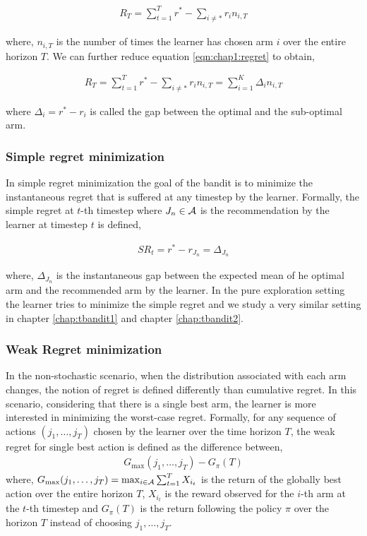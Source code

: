 \begin{eqnarray}
R_{T} = \sum_{t=1}^{T}r^* - \sum_{i\neq *}r_{i}n_{i,T} \label{eqn:chap1:regret}
\end{eqnarray}

where, $n_{i,T}$ is the number of times the learner has chosen arm $i$ over the entire horizon $T$. We can further reduce equation \ref{eqn:chap1:regret} to obtain,

\begin{align*}
R_{T} = \sum_{t=1}^{T}r^* - \sum_{i\neq *}r_{i}n_{i,T} = \sum_{i=1}^{K}\Delta_{i}n_{i,T}
\end{align*}

where $\Delta_{i}=r^* - r_i$ is called the gap between the optimal and the sub-optimal arm.

\subsubsection{Simple regret minimization}
In simple regret minimization the goal of the bandit is to minimize the instantaneous regret that is suffered at any  timestep by the learner. Formally, the simple regret at $t$-th timestep where $J_n\in\mathcal{A}$ is the recommendation by the learner at timestep $t$ is defined,

\begin{align*}
SR_{t} = r^* - r_{J_{n}} = \Delta_{J_n}
\end{align*}

where, $\Delta_{J_n}$ is the instantaneous gap between the expected mean of he optimal arm and the recommended arm by the learner. In the pure exploration setting the learner tries to minimize the simple regret and we study a very similar setting in chapter \ref{chap:tbandit1} and chapter \ref{chap:tbandit2}. 

\subsubsection{Weak Regret minimization}
In the non-stochastic scenario, when the distribution associated with each arm changes, the notion of regret is defined differently than cumulative regret. In this scenario, considering that there is a single best arm, the learner is more interested in minimizing the worst-case regret. Formally, for any sequence of actions $\left( j_1, \ldots , j_T \right)$ chosen by the learner over the time horizon $T$, the weak regret for single best action is defined as the difference between,
\begin{align*}
G_{\max}(j_1,\ldots,j_T) - G_{\pi}(T)
\end{align*}
where, $G_{\max}(j_1,\ldots,j_T) = \max_{i\in\mathcal{A}}\sum_{t=1}^{T}X_{i_t}$ is the return of the globally best action over the entire horizon $T$, $X_{i_t}$ is the reward observed for the $i$-th arm at the $t$-th timestep and $G_{\pi}(T)$ is the return following the policy $\pi$ over the horizon $T$ instead of choosing $j_1,\ldots,j_T$.

